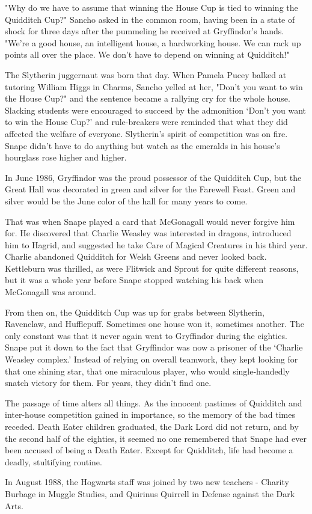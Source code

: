 \documentclass[a4paper,11pt]{article}
\begin{document}
"Why do we have to assume that winning the House Cup is tied to winning the Quidditch Cup?" Sancho asked in the common room, having been in a state of shock for three days after the pummeling he received at Gryffindor's hands. "We're a good house, an intelligent house, a hardworking house. We can rack up points all over the place. We don't have to depend on winning at Quidditch!"

The Slytherin juggernaut was born that day. When Pamela Pucey balked at tutoring William Higgs in Charms, Sancho yelled at her, "Don't you want to win the House Cup?" and the sentence became a rallying cry for the whole house. Slacking students were encouraged to succeed by the admonition `Don't you want to win the House Cup?' and rule-breakers were reminded that what they did affected the welfare of everyone. Slytherin's spirit of competition was on fire. Snape didn't have to do anything but watch as the emeralds in his house's hourglass rose higher and higher.

In June 1986, Gryffindor was the proud possessor of the Quidditch Cup, but the Great Hall was decorated in green and silver for the Farewell Feast. Green and silver would be the June color of the hall for many years to come.

That was when Snape played a card that McGonagall would never forgive him for. He discovered that Charlie Weasley was interested in dragons, introduced him to Hagrid, and suggested he take Care of Magical Creatures in his third year. Charlie abandoned Quidditch for Welsh Greens and never looked back. Kettleburn was thrilled, as were Flitwick and Sprout for quite different reasons, but it was a whole year before Snape stopped watching his back when McGonagall was around.

From then on, the Quidditch Cup was up for grabs between Slytherin, Ravenclaw, and Hufflepuff. Sometimes one house won it, sometimes another. The only constant was that it never again went to Gryffindor during the eighties. Snape put it down to the fact that Gryffindor was now a prisoner of the `Charlie Weasley complex.' Instead of relying on overall teamwork, they kept looking for that one shining star, that one miraculous player, who would single-handedly snatch victory for them. For years, they didn't find one.

The passage of time alters all things. As the innocent pastimes of Quidditch and inter-house competition gained in importance, so the memory of the bad times receded. Death Eater children graduated, the Dark Lord did not return, and by the second half of the eighties, it seemed no one remembered that Snape had ever been accused of being a Death Eater. Except for Quidditch, life had become a deadly, stultifying routine.

In August 1988, the Hogwarts staff was joined by two new teachers - Charity Burbage in Muggle Studies, and Quirinus Quirrell in Defense against the Dark Arts.
\end{document}
